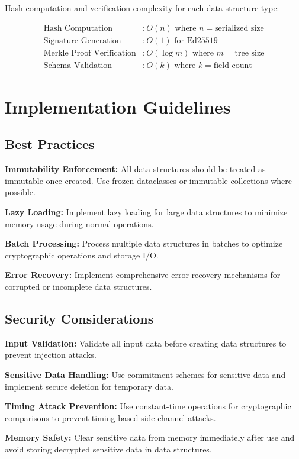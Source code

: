 \documentclass[12pt,a4paper]{article}
\begin{document}
Hash computation and verification complexity for each data structure type:

\begin{align}
\text{Hash Computation} &: O(n) \text{ where } n = \text{serialized size} \\
\text{Signature Generation} &: O(1) \text{ for Ed25519} \\
\text{Merkle Proof Verification} &: O(\log m) \text{ where } m = \text{tree size} \\
\text{Schema Validation} &: O(k) \text{ where } k = \text{field count}
\end{align}

\section{Implementation Guidelines}

\subsection{Best Practices}

\textbf{Immutability Enforcement:} All data structures should be treated as immutable once created. Use frozen dataclasses or immutable collections where possible.

\textbf{Lazy Loading:} Implement lazy loading for large data structures to minimize memory usage during normal operations.

\textbf{Batch Processing:} Process multiple data structures in batches to optimize cryptographic operations and storage I/O.

\textbf{Error Recovery:} Implement comprehensive error recovery mechanisms for corrupted or incomplete data structures.

\subsection{Security Considerations}

\textbf{Input Validation:} Validate all input data before creating data structures to prevent injection attacks.

\textbf{Sensitive Data Handling:} Use commitment schemes for sensitive data and implement secure deletion for temporary data.

\textbf{Timing Attack Prevention:} Use constant-time operations for cryptographic comparisons to prevent timing-based side-channel attacks.

\textbf{Memory Safety:} Clear sensitive data from memory immediately after use and avoid storing decrypted sensitive data in data structures.
\end{document}
